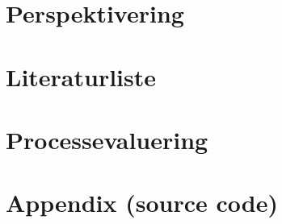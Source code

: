 \documentclass[a4paper,10pt]{article}
\begin{document}
\section{Perspektivering} 


\newpage

\section{Literaturliste} 


\newpage

\section{Processevaluering} 


\newpage

\section{Appendix (source code)}
\end{document}
